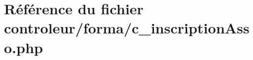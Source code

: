 \hypertarget{c__inscription_asso_8php}{}\section{Référence du fichier controleur/forma/c\+\_\+inscription\+Asso.php}
\label{c__inscription_asso_8php}

